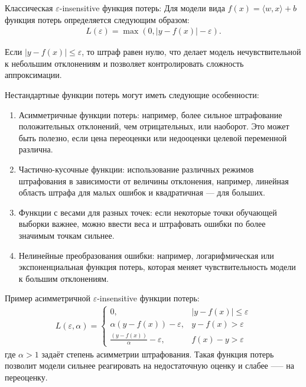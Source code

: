 Классическая \(\varepsilon\)-insensitive функция потерь:
Для модели вида \(f(x) = \langle w, x \rangle + b\) функция потерь определяется следующим образом:
\begin{align*}
    L(\varepsilon) = \max(0, | y - f(x) | - \varepsilon).
\end{align*}

Если \(| y - f(x) | \leq \varepsilon\), то штраф равен нулю, что делает модель нечувствительной к небольшим отклонениям и позволяет контролировать сложность аппроксимации.

Нестандартные функции потерь могут иметь следующие особенности:

\begin{enumerate}
    \item Асимметричные функции потерь: например, более сильное штрафование положительных отклонений, чем отрицательных, или наоборот. Это может быть полезно, если цена переоценки или недооценки целевой переменной различна.
    \item Частично-кусочные функции: использование различных режимов штрафования в зависимости от величины отклонения, например, линейная область штрафа для малых ошибок и квадратичная — для больших.
    \item Функции с весами для разных точек: если некоторые точки обучающей выборки важнее, можно ввести веса и штрафовать ошибки по более значимым точкам сильнее.
    \item Нелинейные преобразования ошибки: например, логарифмическая или экспоненциальная функция потерь, которая меняет чувствительность модели к большим отклонениям.
\end{enumerate}

Пример асимметричной \(\varepsilon\)-insensitive функции потерь:
\begin{align*}
    L(\varepsilon, \alpha) =
    \begin{cases}
        0,                                       & | y - f(x) | \leq \varepsilon \\
        \alpha(y - f(x)) - \varepsilon,          & y - f(x) > \varepsilon        \\
        \frac{(y - f(x))}{\alpha} - \varepsilon, & f(x) - y > \varepsilon
    \end{cases}
\end{align*}
где \(\alpha > 1\) задаёт степень асимметрии штрафования. Такая функция потерь позволит модели сильнее реагировать на недостаточную оценку и слабее —-- на переоценку.

\newpage
